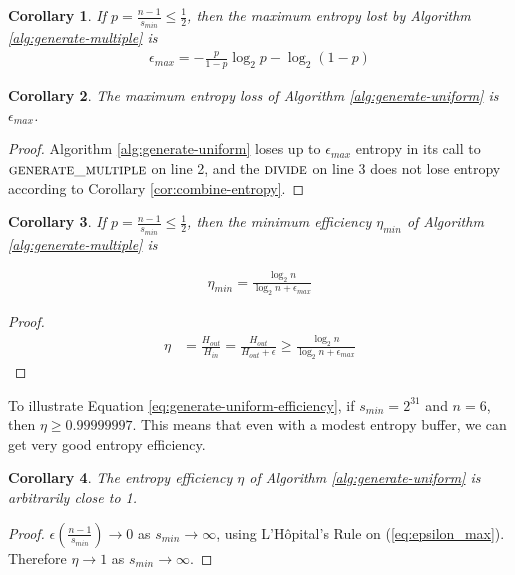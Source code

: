 \documentclass[12pt]{article}
\newtheorem{corollary}{Corollary}
\begin{document}
\begin{corollary}
    If $p = \frac{n-1}{s_{min}} \le \frac{1}{2}$, then the maximum entropy lost by Algorithm \ref{alg:generate-multiple} is
\begin{align}
    \label{eq:epsilon_max}
    \epsilon_{max} = -\frac{p}{1-p}\log_2p - \log_2(1-p)
\end{align}
\end{corollary}

\begin{corollary}
    The maximum entropy loss of Algorithm \ref{alg:generate-uniform} is $\epsilon_{max}$.
\end{corollary}

\begin{proof}
    Algorithm \ref{alg:generate-uniform} loses up to $\epsilon_{max}$ entropy in its call to $\textsc{generate\_multiple}$ on line 2, and the $\textsc{divide}$ on line 3 does not lose entropy according to Corollary \ref{cor:combine-entropy}.
\end{proof}

\begin{corollary}
    If $p = \frac{n-1}{s_{min}} \le \frac{1}{2}$, then the minimum efficiency $\eta_{min}$ of Algorithm \ref{alg:generate-multiple} is 

\begin{align}
    \label{eq:generate-uniform-efficiency}
    \eta_{min} = \frac{\log_2n}{\log_2n + \epsilon_{max}}
\end{align}
\end{corollary}

\begin{proof}
\begin{align}
    \eta & = \frac{H_{out}}{H_{in}}
          = \frac{H_{out}}{H_{out}+\epsilon} 
          \ge \frac{\log_2n}{\log_2n + \epsilon_{max}}
\end{align}
\end{proof}

To illustrate Equation \ref{eq:generate-uniform-efficiency}, if $s_{min}=2^{31}$ and $n=6$, then $\eta \ge 0.99999997$. This means that even with a modest entropy buffer, we can get very good entropy efficiency.

\begin{corollary}
The entropy efficiency $\eta$ of Algorithm \ref{alg:generate-uniform} is arbitrarily close to 1.
\end{corollary}

\begin{proof}
$\epsilon(\frac{n-1}{s_{min}}) \rightarrow 0$ as $s_{min} \rightarrow \infty$, using L'H\^opital's Rule on (\ref{eq:epsilon_max}). Therefore $\eta \rightarrow 1$ as $s_{min} \rightarrow \infty$.
\end{proof}
\end{document}
